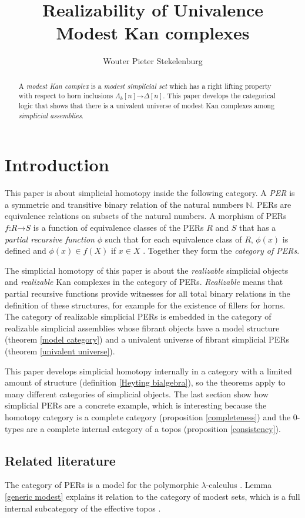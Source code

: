 \documentclass{amsart}
\title{Realizability of Univalence\\
Modest Kan complexes}
\author[W. P. Stekelenburg]{Wouter Pieter Stekelenburg}
\theoremstyle{plain}
\theoremstyle{definition}
\newcommand\N{\mathbb N}
\newcommand\of{\mathord:}
\renewcommand\to{\mathord\rightarrow}
\newcommand\simplex\Delta
\newcommand\horn\Lambda
\begin{document}
\begin{abstract}
A \emph{modest Kan complex} is a \emph{modest simplicial set} which has a right lifting property with respect to horn inclusions $\horn_k[n] \to \simplex[n]$. This paper develops the categorical logic that shows that there is a univalent universe of modest Kan complexes among \emph{simplicial assemblies}.
\end{abstract}

\maketitle

\section{Introduction}
This paper is about simplicial homotopy inside the following category. A \emph{PER} is a symmetric and transitive binary relation of the natural numbers $\N$. PERs are equivalence relations on subsets of the natural numbers. A morphism of PERs $f\of R\to S$ is a function of equivalence classes of the PERs $R$ and $S$ that has a \emph{partial recursive function} $\phi$ such that for each equivalence class of $R$, $\phi(x)$ is defined and $\phi(x)\in f(X)$ if $x\in X$ . Together they form the \emph{category of PERs}. 

The simplicial homotopy of this paper is about the \emph{realizable} simplicial objects and \emph{realizable} Kan complexes in the category of PERs. \emph{Realizable} means that partial recursive functions provide witnesses for all total binary relations in the definition of these structures, for example for the existence of fillers for horns. The category of realizable simplicial PERs is embedded in the category of realizable simplicial assemblies whose fibrant objects have a model structure (theorem \ref{model category}) and a univalent universe of fibrant simplicial PERs (theorem \ref{univalent universe}).

This paper develops simplicial homotopy internally in a category with a limited amount of structure (definition \ref{Heyting bialgebra}), so the theorems apply to many different categories of simplicial objects. The last section show how simplicial PERs are a concrete example, which is interesting because the homotopy category is a complete category (proposition \ref{completeness}) and the 0-types are a complete internal category of a topos (proposition \ref{consistency}).

\subsection{Related literature}
The category of PERs is a model for the polymorphic $\lambda$-calculus \cite{MR1099188,MR2074932,MR1003196}. Lemma \ref{generic modest} explains it relation to the category of modest sets, which is a full internal subcategory of the effective topos \cite{MR1097022,MR1023803,MR2479466}.
\end{document}
